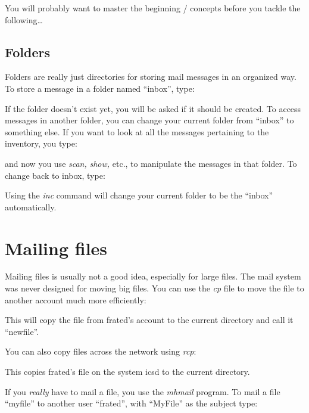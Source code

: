 You will probably want to master the beginning \MH/ concepts before you
tackle the following\dots

\subsection{Folders}

Folders are really just directories for storing mail messages in an
organized way.   To store a message in a folder named
``inbox'', type:


If the folder doesn't exist yet, you will be asked if it should be created.
To access messages in another folder, you can change your current
folder from ``inbox'' to something else.  If you want to look at all
the messages pertaining to the inventory, you type:


and now you use {\it scan,} {\it show,} etc., to manipulate the messages
in that folder.
To change back to inbox, type:


Using the {\it inc\/} command will change your current folder to be the
``inbox'' automatically.
	
\section{Mailing files}

Mailing files is usually not a good idea, especially for large files.  
The mail system was never designed for moving big files. You
can use the {\it cp\/} file to move the file to another account much more
efficiently:


This will copy the file from frated's account to the current directory and
call it ``newfile''. 

You can also copy files across the network using {\it rcp\/}:


This copies frated's file on the system icsd to the current directory.

If you {\it really\/} have to mail a file, you use the {\it mhmail\/} program.
To mail a file ``myfile'' to another user ``frated'', with ``MyFile'' as
the subject type:

